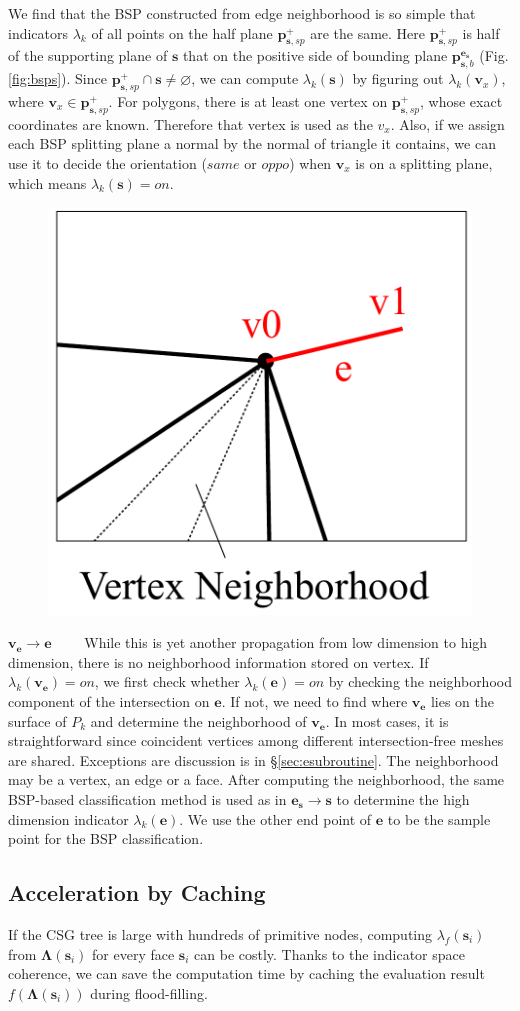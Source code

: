 \documentclass[10pt,journal,compsoc]{IEEEtran}
\begin{document}
We find that the BSP constructed from edge neighborhood is so simple that indicators $\lambda_k$ of all points on the half plane $\bm{p}_{\bm{s}, sp}^+$ are the same. Here $\bm{p}_{\bm{s}, sp}^+$ is half of the supporting plane of $\bm{s}$ that on the positive side of bounding plane $\bm{p}_{\bm{s}, b}^{\bm{e}_{\bm{s}}}$ (Fig. \ref{fig:bsps}). Since $\bm{p}_{\bm{s}, sp}^+ \cap \bm{s} \neq \varnothing$, we can compute $\lambda_k(\bm{s})$ by figuring out $\lambda_k(\bm{v}_x)$, where $\bm{v}_x \in \bm{p}_{\bm{s}, sp}^+$. For polygons, there is at least one vertex on $\bm{p}_{\bm{s}, sp}^+$, whose exact coordinates are known. Therefore that vertex is used as the $v_x$. Also, if we assign each BSP splitting plane a normal by the normal of triangle it contains, we can use it to decide the orientation ($same$ or $oppo$) when $\bm{v}_x$ is on a splitting plane, which means $\lambda_k(\bm{s})=on$.

\vspace{0.5em}
\begin{figure}
\includegraphics[width=1.3 in]{vneighbor}
\end{figure}
\noindent\textbf{$\bm{\bm{v}_{\bm{e}}\to e}$}~~~~ While this is yet another propagation from low dimension to high dimension, there is no neighborhood information stored on vertex. If $\lambda_k(\bm{v}_{\bm{e}})=on$, we first check whether $\lambda_k(\bm{e}) = on$ by checking the neighborhood component of the intersection on $\bm{e}$. If not, we need to find where $\bm{v}_{\bm{e}}$ lies on the surface of $P_k$ and determine the neighborhood of $\bm{v}_{\bm{e}}$. In most cases, it is straightforward since coincident vertices among different intersection-free meshes are shared. Exceptions are discussion is in \S\ref{sec:esubroutine}. The neighborhood may be a vertex, an edge or a face. After computing the neighborhood, the same BSP-based classification method is used as in ${\bm{e}_{\bm{s}}\to \bm{s}}$ to determine the high dimension indicator $\lambda_k(\bm{e})$. We use the other end point of $\bm{e}$ to be the sample point for the BSP classification.


\subsection{Acceleration by Caching}
\label{sec:acc}
If the CSG tree is large with hundreds of primitive nodes, computing $\lambda_f(\bm{s}_i)$ from $\boldsymbol{\Lambda}(\bm{s}_i)$ for every face $\bm{s}_i$ can be costly. Thanks to the indicator space coherence, we can save the computation time by caching the evaluation result $f(\boldsymbol{\Lambda}(\bm{s}_i))$ during flood-filling.
\end{document}
